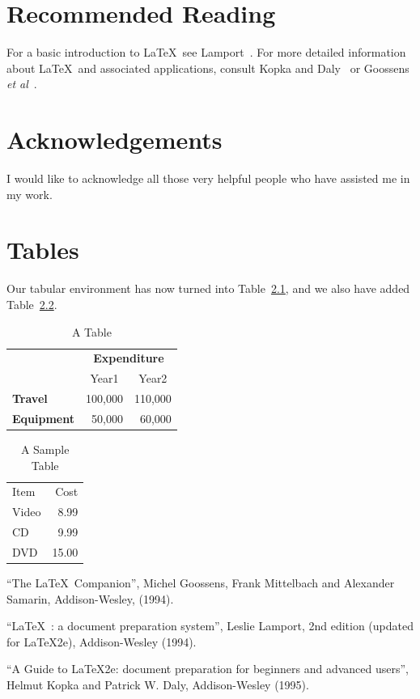 \documentclass[12pt,captions=tableabove]{scrbook}
\begin{document}
\chapter{Recommended Reading}

For a basic introduction to \LaTeX\ see Lamport~\cite{lamport94}.
For more detailed information about \LaTeX\ and
associated applications, consult Kopka and Daly~\cite{kopka95}
or Goossens \emph{et al}~\cite{goossens94}.

\chapter*{Acknowledgements}

I would like to acknowledge all those
very helpful people who have assisted
me in my work.

\appendix
\chapter{Tables}

Our tabular environment has now turned into Table~\ref{tab:example},
and we also have added Table~\ref{tab:sample}.

\begin{table}[hbtp]
\caption{A Table}
\label{tab:example}
\centering
\begin{tabular}{lrr}
 & \multicolumn{2}{c}{\bfseries Expenditure}\\
 & \multicolumn{1}{c}{Year1} & \multicolumn{1}{c}{Year2}\\
\bfseries Travel & 100,000 & 110,000\\
\bfseries Equipment & 50,000 & 60,000
\end{tabular}
\end{table}

\begin{table}[hbtp]
\caption{A Sample Table}
\label{tab:sample}
\centering
\begin{tabular}{lr}
Item & Cost\\
Video & 8.99\\
CD    & 9.99\\
DVD   & 15.00
\end{tabular}
\end{table}

\begin{thebibliography}{1}
 ``The \LaTeX\ Companion'', Michel Goossens, Frank Mittelbach and
Alexander Samarin, Addison-Wesley, (1994).

 ``\LaTeX\ : a document preparation system'', Leslie Lamport,
2nd edition (updated for \LaTeX2e), Addison-Wesley (1994).

 ``A Guide to \LaTeX2e: document preparation for beginners
and advanced users'', Helmut Kopka and Patrick W. Daly, Addison-Wesley (1995).

\end{thebibliography}
\end{document}
